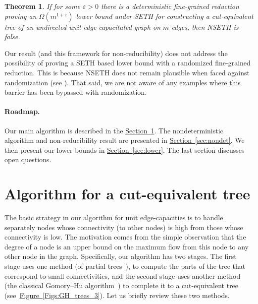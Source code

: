 \documentclass[11pt]{article}
\numberwithin{equation}{section}
\newtheorem{theorem}{Theorem}[section]
\theoremstyle{definition}
\theoremstyle{plain}
\newcommand{\expref}[2]{\hyperref[#2]{#1~\ref{#2}}}
\theoremstyle{plain}
\newcommand{\SETH}{SETH\xspace}
\newcommand{\NSETH}{NSETH\xspace}
\newcommand\eps{\varepsilon}
\begin{document}
\begin{theorem}
\label{thm3}
If for some $\eps>0$ there is a deterministic fine-grained reduction proving an $\Omega(m^{1+\eps})$ lower bound under \SETH for constructing a cut-equivalent tree of an undirected unit edge-capacitated graph on $m$ edges, then \NSETH is false.
\end{theorem}

Our result (and this framework for non-reducibility) does not address the possibility of proving a \SETH based lower bound with a randomized fine-grained reduction.
This is because \NSETH does not remain plausible when faced against randomization (see \cite{carmosino2016nondeterministic,Wil16_MASETH}).
That said, we are not aware of any examples where this barrier has been
%
bypassed with randomization.


\paragraph{Roadmap.} Our main algorithm is described in the \expref{Section}{GHU_Alg}. The nondeterministic algorithm and non-reducibility result are presented in \expref{Section}{sec:nondet}. We then present our lower bounds in \expref{Section}{sec:lower}. The last section discusses open questions.


\section{Algorithm for a cut-equivalent tree}
\label{GHU_Alg}

The basic strategy in our algorithm for unit edge-capacities
is to handle separately nodes whose connectivity (to other nodes)
is high from those whose connectivity is low.
The motivation comes from the simple observation that the degree of a node is an upper bound on the maximum flow from this node to any other node in the graph.
%
Specifically, our algorithm has two stages.
The first stage uses one method (of partial trees~\cite{HKP07,BHKP07}),
to compute the parts of the tree that correspond to small connectivities,
and the second stage uses another method
(the classical Gomory--Hu   %
algorithm~\cite{GH61})
to complete it to a cut-equivalent tree (see~\expref{Figure}{Figs:GH_trees_3}).
Let us briefly review these two methods.
\end{document}

